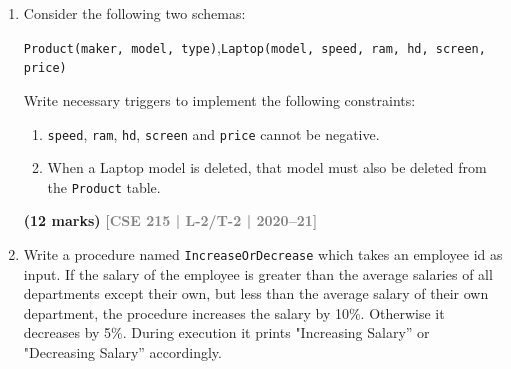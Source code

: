 \documentclass[12pt]{article}
\newcommand{\yr}[1]{\hfill\textcolor{gray}{\small\textbf{[#1]}}}
\newcommand{\mk}[1]{\textcolor{orange!70!black}{\small\textbf{(#1 marks)}}}
\begin{document}
\begin{enumerate}
\item Consider the following two schemas:
\begin{center}
\texttt{Product(maker, model, type)},\quad \texttt{Laptop(model, speed, ram, hd, screen, price)}
\end{center}
Write necessary triggers to implement the following constraints:
\begin{enumerate}
  \item \texttt{speed}, \texttt{ram}, \texttt{hd}, \texttt{screen} and \texttt{price} cannot be negative.
  \item When a Laptop model is deleted, that model must also be deleted from the \texttt{Product} table.
\end{enumerate}
 \mk{12} \yr{CSE 215 | L-2/T-2 | 2020--21}

\item Write a procedure named \texttt{IncreaseOrDecrease} which takes an employee id as input. If the salary of the employee is greater than the average salaries of all departments except their own, but less than the average salary of their own department, the procedure increases the salary by 10\%. Otherwise it decreases by 5\%. During execution it prints "Increasing Salary'' or "Decreasing Salary'' accordingly.

\begin{center}
  
    \begin{tikzpicture}[
        >=Stealth,
        line width=0.6pt,
        table_box/.style={
            draw=borderblue,
            fill=white,
            rounded corners=2pt,
            thick,
            inner sep=8pt,
            font=\small,
            align=left
        },
        join_label/.style={
            draw=borderblue!70,
            dashed,
            fill=labelbg,
            rounded corners=3pt,
            font=\scriptsize,
            inner sep=3pt,
            align=center
        },
        rel_line/.style={
            draw=black!70,
            dashed,
            thick
        }
    ]



\end{tikzpicture}
\end{center}
\end{enumerate}
\end{document}
